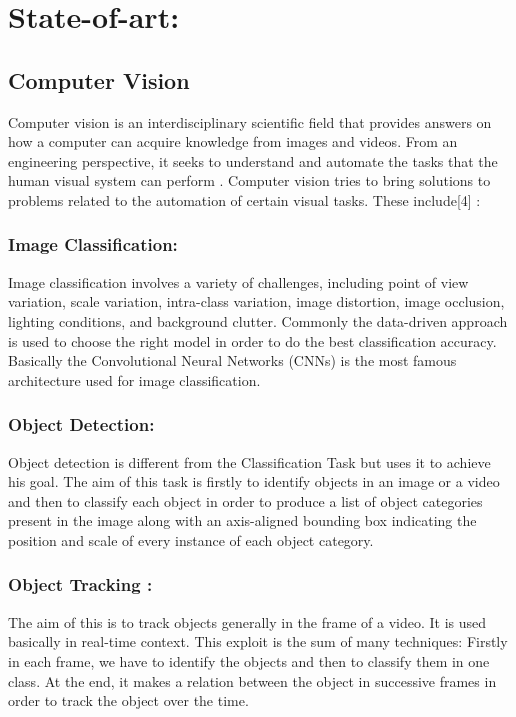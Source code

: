 \documentclass[a4paper]{article}
\begin{document}
\section{State-of-art: }
\subsection{Computer Vision}
Computer vision is an interdisciplinary scientific field that provides answers on how a computer can acquire knowledge from images and videos. 
From an engineering perspective, it seeks to understand and automate the tasks that the human visual system can perform \cite{vision}.
Computer vision tries to bring solutions to problems related to the automation of certain visual tasks. These include[4]  :

\subsubsection{Image Classification: }
Image classification involves a variety of challenges, including point of view variation, scale variation, intra-class variation, image distortion, image occlusion, lighting conditions, and background clutter.
Commonly the data-driven approach is used to choose the right model in order to do the best classification accuracy.
Basically the Convolutional Neural Networks (CNNs) is the most famous architecture used for image classification.

\subsubsection{Object Detection:}
Object detection is different from the Classification Task but uses it to achieve his goal. The aim of this task is firstly to identify objects in an image or a video and then to classify each object in order to produce a list of object categories present in the image along with an axis-aligned bounding box indicating the position and scale of every instance of each object category.

\subsubsection{Object Tracking :}

The aim of this is to track objects generally in the frame of a video. It is used basically in real-time context. This exploit is the sum of many techniques: Firstly in each frame, we have to identify the objects and then to classify them in one class. At the end, it makes a relation between the object in successive frames in order to track the object over the time.  
\end{document}
